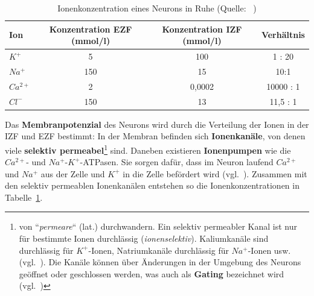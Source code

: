 {\renewcommand{\arraystretch}{1.5}%
\begin{table} %
 \centering
 \begin{tabular}{l | c | c | c }
  \textbf{Ion} & \textbf{Konzentration EZF (mmol/l)} & \textbf{Konzentration IZF (mmol/l)} & \textbf{Verhältnis} \\
  \hline
  $K^+$      & 5 & 100 & 1 : 20 \\
  $Na^+$     & 150 & 15 & 10:1 \\
  $Ca^{2+}$  & 2 & 0,0002 & 10000 : 1 \\
  $Cl^-$     & 150 & 13 & 11,5 : 1 \\
 \end{tabular}
 \caption{Ionenkonzentration eines Neurons in Ruhe (Quelle: ~\cite[75, Abb. 3.15]{BCP18})}
 \label{tab:ionenkonzentration}
\end{table}


Das \textbf{Membranpotenzial} des Neurons wird durch die Verteilung der Ionen in der IZF und EZF bestimmt: In der Membran befinden sich \textbf{Ionenkanäle}, von denen viele \textbf{selektiv permeabel}\footnote{
 von ``\textit{permeare}`` (lat.) durchwandern.
 Ein selektiv permeabler Kanal ist nur für bestimmte Ionen durchlässig (\textit{ionenselektiv}). Kaliumkanäle sind durchlässig für $K^+$-Ionen, Natriumkanäle durchlässig für $Na^+$-Ionen usw. (vgl.~\cite[66]{BCP18}).
 Die Kanäle können über Änderungen in der Umgebung des Neurons geöffnet oder geschlossen werden, was auch als \textbf{Gating} bezeichnet wird (vgl.~\cite[108]{KSJ+13})
} sind.
Daneben existieren \textbf{Ionenpumpen} wie die $Ca^{2+}$- und $Na^+$-$K^+$-ATPasen. Sie sorgen dafür, dass im Neuron laufend $Ca^{2+}$ und $Na^+$ aus der Zelle und $K^+$ in die Zelle befördert wird (vgl.~\cite[44]{SD07}). Zusammen mit den selektiv permeablen Ionenkanälen entstehen so die Ionenkonzentrationen in Tabelle~\ref{tab:ionenkonzentration}.\\


}
